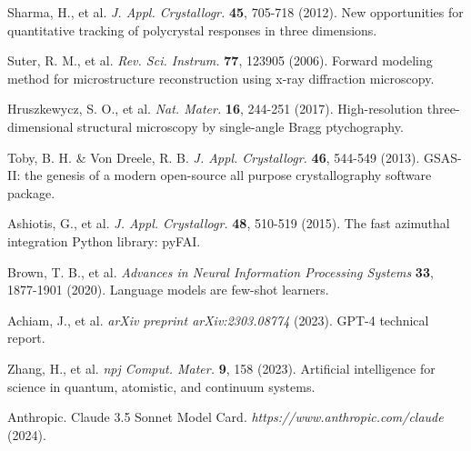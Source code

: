 \documentclass[11pt]{article}
\begin{document}
\begin{thebibliography}{99}

Sharma, H., et al.
\textit{J. Appl. Crystallogr.} \textbf{45}, 705-718 (2012).
New opportunities for quantitative tracking of polycrystal responses in three dimensions.

Suter, R. M., et al.
\textit{Rev. Sci. Instrum.} \textbf{77}, 123905 (2006).
Forward modeling method for microstructure reconstruction using x-ray diffraction microscopy.

Hruszkewycz, S. O., et al.
\textit{Nat. Mater.} \textbf{16}, 244-251 (2017).
High-resolution three-dimensional structural microscopy by single-angle Bragg ptychography.

Toby, B. H. \& Von Dreele, R. B.
\textit{J. Appl. Crystallogr.} \textbf{46}, 544-549 (2013).
GSAS-II: the genesis of a modern open-source all purpose crystallography software package.

Ashiotis, G., et al.
\textit{J. Appl. Crystallogr.} \textbf{48}, 510-519 (2015).
The fast azimuthal integration Python library: pyFAI.

Brown, T. B., et al.
\textit{Advances in Neural Information Processing Systems} \textbf{33}, 1877-1901 (2020).
Language models are few-shot learners.

Achiam, J., et al.
\textit{arXiv preprint arXiv:2303.08774} (2023).
GPT-4 technical report.

Zhang, H., et al.
\textit{npj Comput. Mater.} \textbf{9}, 158 (2023).
Artificial intelligence for science in quantum, atomistic, and continuum systems.

Anthropic.
Claude 3.5 Sonnet Model Card.
\textit{https://www.anthropic.com/claude} (2024).

\end{thebibliography}
\end{document}

